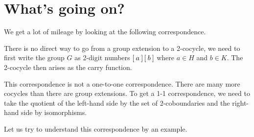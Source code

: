 \section{What's going on?}
We get a lot of mileage by looking at the following correspondence.
\begin{mdframed}
\end{mdframed}
There is no direct way to go from a group extension to a 2-cocycle, we need to first write the group $G$ as 2-digit numbers $\left[\: a \:\right]\left[\: b \:\right]$ where $a \in H$ and $b \in K$.
The 2-cocycle then arises as the carry function.

This correspondence is not a one-to-one correspondence. There are many more cocycles than there are group extensions.
To get a 1-1 correspondence, we need to take the quotient of the left-hand side by the set of 2-coboundaries and the right-hand side by isomorphisms.
\begin{mdframed}
\end{mdframed}
Let us try to understand this correspondence by an example.











